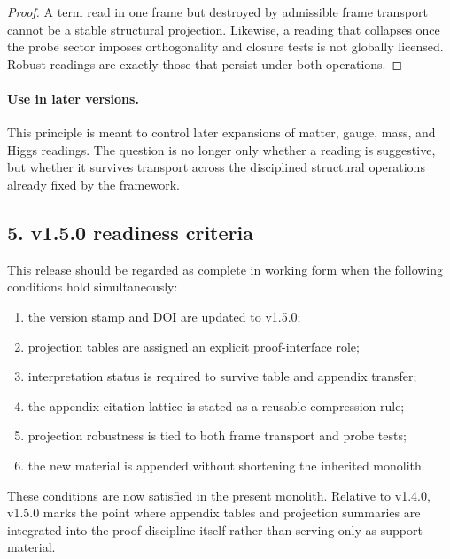 \begin{proof}
A term read in one frame but destroyed by admissible frame transport cannot be a
stable structural projection. Likewise, a reading that collapses once the probe
sector imposes orthogonality and closure tests is not globally licensed. Robust
readings are exactly those that persist under both operations.
\end{proof}

\paragraph{Use in later versions.}
This principle is meant to control later expansions of matter, gauge, mass, and
Higgs readings. The question is no longer only whether a reading is suggestive,
but whether it survives transport across the disciplined structural operations
already fixed by the framework.

\subsection*{5. v1.5.0 readiness criteria}
This release should be regarded as complete in working form when the following
conditions hold simultaneously:
\begin{enumerate}[leftmargin=2em]
  \item the version stamp and DOI are updated to v1.5.0;
  \item projection tables are assigned an explicit proof-interface role;
  \item interpretation status is required to survive table and appendix transfer;
  \item the appendix-citation lattice is stated as a reusable compression rule;
  \item projection robustness is tied to both frame transport and probe tests;
  \item the new material is appended without shortening the inherited monolith.
\end{enumerate}

These conditions are now satisfied in the present monolith. Relative to v1.4.0,
v1.5.0 marks the point where appendix tables and projection summaries are
integrated into the proof discipline itself rather than serving only as support
material.

\clearpage
\clearpage


\clearpage
